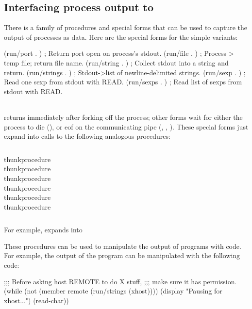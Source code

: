 \subsection{Interfacing process output to {\Scheme}}
\label{sec:io-interface}
There is a family of procedures and special forms that can be used
to capture the output of processes as {\Scheme} data. 
Here are the special forms for the simple variants:
\\[2ex]%
\begin{codebox}
(run/port    . ) ; Return port open on process's stdout.
(run/file    . ) ; Process > temp file; return file name.
(run/string  . ) ; Collect stdout into a string and return.
(run/strings . ) ; Stdout->list of newline-delimited strings.
(run/sexp    . ) ; Read one sexp from stdout with READ.
(run/sexps   . ) ; Read list of sexps from stdout with READ.\end{codebox}
\\[2ex]%
%
 returns immediately after forking off the process;
other forms wait for either the process to die (),
or eof on the communicating pipe 
(, , ).
These special forms just expand into calls to the following analogous
procedures:
%
\begin{center}
\begin{column}
       {thunk}{procedure} \\
       {thunk}{procedure} \\
     {thunk}{procedure} \\
    {thunk}{procedure} \\
       {thunk}{procedure} \\
      {thunk}{procedure}
\end{column}
\end{center}
%
For example,  expands into

These procedures can be used to manipulate the output of {\Unix}
programs with {\Scheme} code. For example, the output of the 
program can be manipulated with the following code:
\begin{code}
;;; Before asking host REMOTE to do X stuff, 
;;; make sure it has permission.
(while (not (member remote (run/strings (xhost))))
  (display "Pausing for xhost...")
  (read-char))\end{code}

